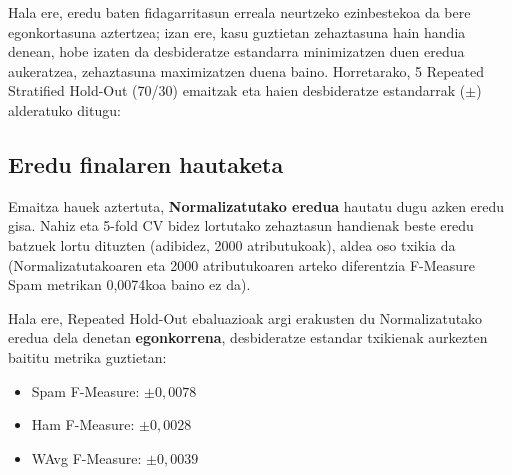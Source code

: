 \documentclass[12pt, a4paper]{article}
\begin{document}
Hala ere, eredu baten fidagarritasun erreala neurtzeko ezinbestekoa da bere egonkortasuna aztertzea; izan ere, kasu guztietan zehaztasuna hain handia denean, hobe izaten da desbideratze estandarra minimizatzen duen eredua aukeratzea, zehaztasuna maximizatzen duena baino. Horretarako, 5 Repeated Stratified Hold-Out (70/30) emaitzak eta haien desbideratze estandarrak ($\pm$) alderatuko ditugu:

\begin{table}[H]
    \centering
    \caption{Bost ereduen 5 Repeated Stratified Hold-Out (70/30) emaitzen konparaketa}
\end{table}

\subsection{Eredu finalaren hautaketa}

Emaitza hauek aztertuta, \textbf{Normalizatutako eredua} hautatu dugu azken eredu gisa. Nahiz eta 5-fold CV bidez lortutako zehaztasun handienak beste eredu batzuek lortu dituzten (adibidez, 2000 atributukoak), aldea oso txikia da (Normalizatutakoaren eta 2000 atributukoaren arteko diferentzia F-Measure Spam metrikan 0,0074koa baino ez da).

Hala ere, Repeated Hold-Out ebaluazioak argi erakusten du Normalizatutako eredua dela denetan \textbf{egonkorrena}, desbideratze estandar txikienak aurkezten baititu metrika guztietan:
\begin{itemize}
    \item Spam F-Measure: $\pm 0{,}0078$
    \item Ham F-Measure: $\pm 0{,}0028$
    \item WAvg F-Measure: $\pm 0{,}0039$
\end{itemize}
\end{document}
